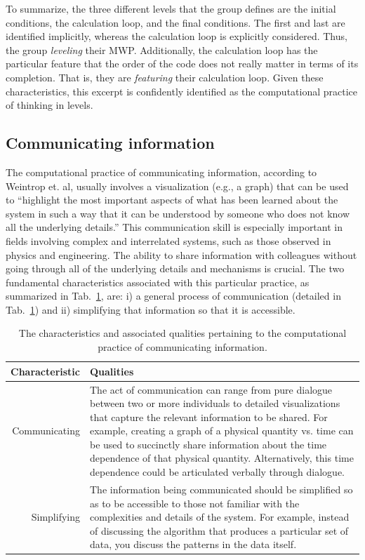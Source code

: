 \documentclass{msuphddissertation}
\begin{document}
\begin{doublespace}
To summarize, the three different levels that the group defines are the initial conditions, the calculation loop, and the final conditions.  The first and last are identified implicitly, whereas the calculation loop is explicitly considered.  Thus, the group \textit{leveling} their MWP.  Additionally, the calculation loop has the particular feature that the order of the code does not really matter in terms of its completion.  That is, they are \textit{featuring} their calculation loop.  Given these characteristics, this excerpt is confidently identified as the computational practice of thinking in levels.

%
%
%
%
%
%
%
%
%
%
%
%
%
%
%
%

\subsection{Communicating information}

The computational practice of communicating information, according to Weintrop et. al, usually involves a visualization (e.g., a graph) that can be used to ``highlight the most important aspects of what has been learned about the system in such a way that it can be understood by someone who does not know all the underlying details.''  This communication skill is especially important in fields involving complex and interrelated systems, such as those observed in physics and engineering.  The ability to share information with colleagues without going through all of the underlying details and mechanisms is crucial.  The two fundamental characteristics associated with this particular practice, as summarized in Tab.~\ref{CH5:CommunicatingInformation}, are: i) a general process of communication (detailed in Tab.~\ref{CH5:CommunicatingInformation}) and ii) simplifying that information so that it is accessible.

\begin{table}
\begin{tabular}{r|p{}}
Characteristic & Qualities \\\hline\hline
Communicating & The act of communication can range from pure dialogue between two or more individuals to detailed visualizations that capture the relevant information to be shared.  For example, creating a graph of a physical quantity vs. time can be used to succinctly share information about the time dependence of that physical quantity.  Alternatively, this time dependence could be articulated verbally through dialogue.\\
Simplifying & The information being communicated should be simplified so as to be accessible to those not familiar with the complexities and details of the system.  For example, instead of discussing the algorithm that produces a particular set of data, you discuss the patterns in the data itself.\\
\end{tabular}\caption{The characteristics and associated qualities pertaining to the computational practice of communicating information.}\label{CH5:CommunicatingInformation}
\end{table}


\end{doublespace}
\end{document}
